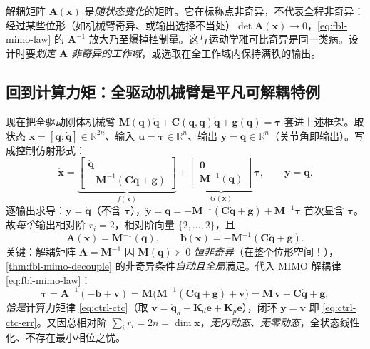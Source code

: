 \begin{pitfall}
解耦矩阵 $\mathbf{A}(\mathbf{x})$ 是\emph{随状态变化}的矩阵。它在标称点非奇异，不代表全程非奇异：经过某些位形（如机械臂奇异、或输出选择不当处）$\det\mathbf{A}(\mathbf{x})\to0$，\cref{eq:fbl-mimo-law} 的 $\mathbf{A}^{-1}$ 放大乃至爆掉控制量。这与运动学雅可比奇异是同一类病。设计时要\emph{划定 $\mathbf{A}$ 非奇异的工作域}，或选取在全工作域内保持满秩的输出。
\end{pitfall}

\subsection{回到计算力矩：全驱动机械臂是平凡可解耦特例}
\label{sec:fbl-ctc-link}

现在把全驱动刚体机械臂 $\mathbf{M}(\mathbf{q})\ddot{\mathbf{q}}+\mathbf{C}(\mathbf{q},\dot{\mathbf{q}})\dot{\mathbf{q}}+\mathbf{g}(\mathbf{q})=\boldsymbol{\tau}$ 套进上述框架。取状态 $\mathbf{x}=[\mathbf{q};\dot{\mathbf{q}}]\in\mathbb{R}^{2n}$、输入 $\mathbf{u}=\boldsymbol{\tau}\in\mathbb{R}^n$、输出 $\mathbf{y}=\mathbf{q}\in\mathbb{R}^n$（关节角即输出）。写成控制仿射形式：
\begin{equation}
  \dot{\mathbf{x}}=\underbrace{\begin{bmatrix}\dot{\mathbf{q}}\\ -\mathbf{M}^{-1}(\mathbf{C}\dot{\mathbf{q}}+\mathbf{g})\end{bmatrix}}_{f(\mathbf{x})}+\underbrace{\begin{bmatrix}\mathbf{0}\\ \mathbf{M}^{-1}(\mathbf{q})\end{bmatrix}}_{G(\mathbf{x})}\boldsymbol{\tau},\qquad \mathbf{y}=\mathbf{q}.
  \label{eq:fbl-manip-affine}
\end{equation}
逐输出求导：$\dot{\mathbf{y}}=\dot{\mathbf{q}}$（不含 $\boldsymbol{\tau}$），$\ddot{\mathbf{y}}=\ddot{\mathbf{q}}=-\mathbf{M}^{-1}(\mathbf{C}\dot{\mathbf{q}}+\mathbf{g})+\mathbf{M}^{-1}\boldsymbol{\tau}$ 首次显含 $\boldsymbol{\tau}$。故\emph{每个}输出相对阶 $r_i=2$，相对阶向量 $\{2,\dots,2\}$，且
\begin{equation}
  \mathbf{A}(\mathbf{x})=\mathbf{M}^{-1}(\mathbf{q}),\qquad \mathbf{b}(\mathbf{x})=-\mathbf{M}^{-1}(\mathbf{C}\dot{\mathbf{q}}+\mathbf{g}).
  \label{eq:fbl-manip-A}
\end{equation}
关键：解耦矩阵 $\mathbf{A}=\mathbf{M}^{-1}$ 因 $\mathbf{M}(\mathbf{q})\succ0$ \emph{恒非奇异}（在整个位形空间！），\cref{thm:fbl-mimo-decouple} 的非奇异条件\emph{自动且全局}满足。代入 MIMO 解耦律 \cref{eq:fbl-mimo-law}：
\begin{equation}
  \boldsymbol{\tau}=\mathbf{A}^{-1}(-\mathbf{b}+\mathbf{v})=\mathbf{M}\big(\mathbf{M}^{-1}(\mathbf{C}\dot{\mathbf{q}}+\mathbf{g})+\mathbf{v}\big)=\mathbf{M}\,\mathbf{v}+\mathbf{C}\dot{\mathbf{q}}+\mathbf{g},
  \label{eq:fbl-ctc-recover}
\end{equation}
\emph{恰是}计算力矩律 \cref{eq:ctrl-ctc}（取 $\mathbf{v}=\ddot{\mathbf{q}}_d+\mathbf{K}_d\dot{\mathbf{e}}+\mathbf{K}_p\mathbf{e}$），闭环 $\ddot{\mathbf{y}}=\mathbf{v}$ 即 \cref{eq:ctrl-ctc-err}。又因总相对阶 $\sum_i r_i=2n=\dim\mathbf{x}$，\emph{无内动态、无零动态}，全状态线性化、不存在最小相位之忧。

